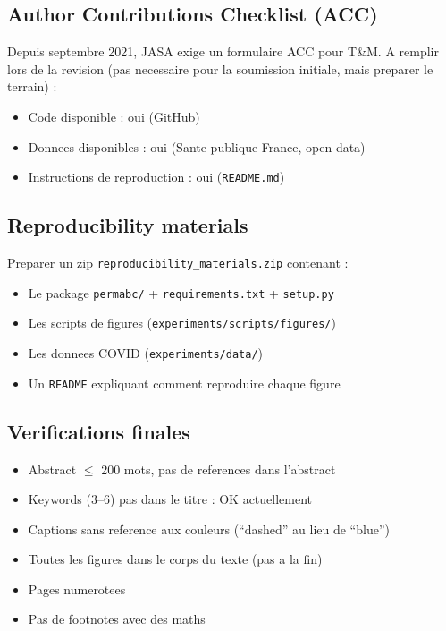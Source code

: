 \documentclass[11pt]{article}
\begin{document}
\subsection{Author Contributions Checklist (ACC)}

Depuis septembre 2021, JASA exige un formulaire ACC pour T\&M. A remplir lors de la revision (pas necessaire pour la soumission initiale, mais preparer le terrain) :
\begin{itemize}[nosep]
    \item Code disponible : oui (GitHub)
    \item Donnees disponibles : oui (Sante publique France, open data)
    \item Instructions de reproduction : oui (\texttt{README.md})
\end{itemize}

\subsection{Reproducibility materials}

Preparer un zip \texttt{reproducibility\_materials.zip} contenant :
\begin{itemize}[nosep]
    \item Le package \texttt{permabc/} + \texttt{requirements.txt} + \texttt{setup.py}
    \item Les scripts de figures (\texttt{experiments/scripts/figures/})
    \item Les donnees COVID (\texttt{experiments/data/})
    \item Un \texttt{README} expliquant comment reproduire chaque figure
\end{itemize}

\subsection{Verifications finales}

\begin{itemize}[nosep]
    \item Abstract $\leq$ 200 mots, pas de references dans l'abstract
    \item Keywords (3--6) pas dans le titre : OK actuellement
    \item Captions sans reference aux couleurs (``dashed'' au lieu de ``blue'')
    \item Toutes les figures dans le corps du texte (pas a la fin)
    \item Pages numerotees
    \item Pas de footnotes avec des maths
\end{itemize}
\end{document}
